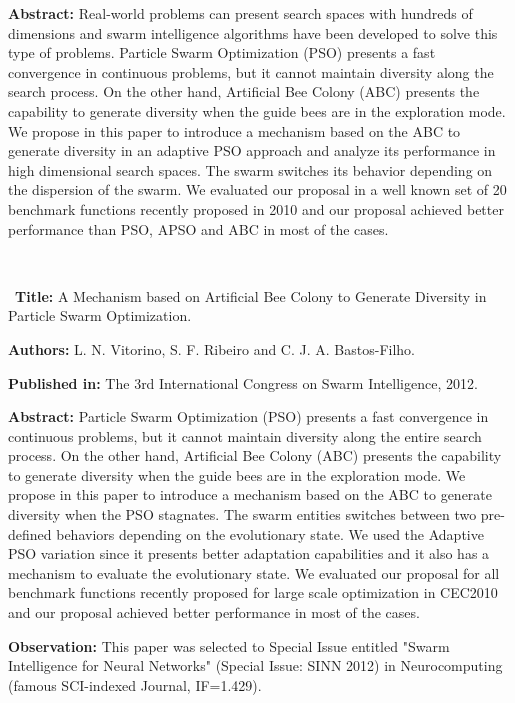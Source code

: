 \textbf{Abstract:} Real-world problems can present search spaces with hundreds of dimensions and swarm intelligence algorithms have been developed to solve this type of problems. Particle Swarm Optimization (PSO) presents a fast convergence in continuous problems, but it cannot maintain diversity along the search process. On the other hand, Artificial Bee Colony (ABC) presents the capability to generate diversity when the guide bees are in the exploration mode. We propose in this paper to introduce a mechanism based on the ABC to generate diversity in an adaptive PSO approach and analyze its performance in high dimensional search spaces. The swarm switches its behavior depending on the dispersion of the swarm. We evaluated our proposal in a well known set of 20 benchmark functions recently proposed in 2010
and our proposal achieved better performance than PSO, APSO and ABC in most of the cases.

\

\
\textbf{Title:} A Mechanism based on Artificial Bee Colony to Generate Diversity in Particle Swarm Optimization.

\textbf{Authors:} L. N. Vitorino, S. F. Ribeiro and C. J. A. Bastos-Filho.

\textbf{Published in:} The 3rd International Congress on Swarm Intelligence, 2012.

\textbf{Abstract:} Particle Swarm Optimization (PSO) presents a fast convergence in continuous problems, but it cannot maintain diversity along the entire search process. On the other hand, Artificial Bee Colony (ABC) presents the capability to generate diversity when the guide bees are in the exploration mode. We propose in this paper to introduce a mechanism based on the ABC to generate diversity when the PSO stagnates. The swarm entities switches between two pre-defined behaviors depending on the evolutionary state. We used the Adaptive PSO variation since it presents better adaptation capabilities and it also has a mechanism to evaluate the evolutionary state. We evaluated our proposal for all benchmark functions recently proposed for large scale optimization in CEC2010 and our proposal achieved better performance in most of the cases.


\textbf{Observation:} This paper was selected to Special Issue entitled "Swarm Intelligence for Neural Networks" (Special Issue: SINN 2012) in Neurocomputing (famous SCI-indexed Journal, IF=1.429).
\

\



\pagebreak
